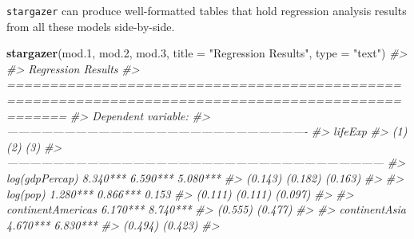 \documentclass[
]{book}
\newenvironment{Shaded}{\begin{snugshade}}{\end{snugshade}}
\newcommand{\CommentTok}[1]{\textcolor[rgb]{0.56,0.35,0.01}{\textit{#1}}}
\newcommand{\DataTypeTok}[1]{\textcolor[rgb]{0.13,0.29,0.53}{#1}}
\newcommand{\FloatTok}[1]{\textcolor[rgb]{0.00,0.00,0.81}{#1}}
\newcommand{\KeywordTok}[1]{\textcolor[rgb]{0.13,0.29,0.53}{\textbf{#1}}}
\newcommand{\NormalTok}[1]{#1}
\newcommand{\StringTok}[1]{\textcolor[rgb]{0.31,0.60,0.02}{#1}}
\begin{document}
\texttt{stargazer} can produce well-formatted tables that hold regression analysis results from all these models side-by-side.

\begin{Shaded}
\begin{Highlighting}[]
\KeywordTok{stargazer}\NormalTok{(mod}\FloatTok{.1}\NormalTok{, mod}\FloatTok{.2}\NormalTok{, mod}\FloatTok{.3}\NormalTok{, }\DataTypeTok{title =} \StringTok{"Regression Results"}\NormalTok{, }\DataTypeTok{type =} \StringTok{"text"}\NormalTok{)}
\CommentTok{#> }
\CommentTok{#> Regression Results}
\CommentTok{#> ===================================================================================================}
\CommentTok{#>                                                   Dependent variable:                              }
\CommentTok{#>                     -------------------------------------------------------------------------------}
\CommentTok{#>                                                         lifeExp                                    }
\CommentTok{#>                                 (1)                        (2)                       (3)           }
\CommentTok{#> ---------------------------------------------------------------------------------------------------}
\CommentTok{#> log(gdpPercap)               8.340***                   6.590***                  5.080***         }
\CommentTok{#>                               (0.143)                    (0.182)                   (0.163)         }
\CommentTok{#>                                                                                                    }
\CommentTok{#> log(pop)                     1.280***                   0.866***                    0.153          }
\CommentTok{#>                               (0.111)                    (0.111)                   (0.097)         }
\CommentTok{#>                                                                                                    }
\CommentTok{#> continentAmericas                                       6.170***                  8.740***         }
\CommentTok{#>                                                          (0.555)                   (0.477)         }
\CommentTok{#>                                                                                                    }
\CommentTok{#> continentAsia                                           4.670***                  6.830***         }
\CommentTok{#>                                                          (0.494)                   (0.423)         }
\CommentTok{#>                                                                                                    }

\end{Highlighting}
\end{Shaded}
\end{document}
